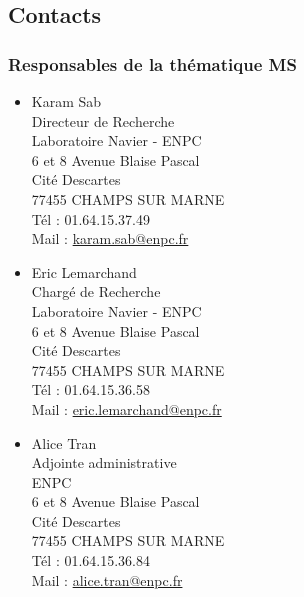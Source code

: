\documentclass[french,11pt]{article}
\begin{document}
\subsection{Contacts}

\subsubsection{Responsables de la thématique MS}
\begin{itemize}

\item Karam Sab\\
Directeur de Recherche\\
Laboratoire Navier - ENPC\\
6 et 8 Avenue Blaise Pascal\\
Cité Descartes\\
77455 CHAMPS SUR MARNE\\
Tél : 01.64.15.37.49\\
Mail : \href{mailto:karam.sab@enpc.fr}{karam.sab@enpc.fr}\\

\item Eric Lemarchand\\
Chargé de Recherche\\
Laboratoire Navier - ENPC\\
6 et 8 Avenue Blaise Pascal\\
Cité Descartes\\
77455 CHAMPS SUR MARNE\\
Tél : 01.64.15.36.58\\
Mail : \href{mailto:eric.lemarchand@enpc.fr}{eric.lemarchand@enpc.fr}\\


\item 
Alice Tran \\
Adjointe administrative \\
ENPC \\
6 et 8 Avenue Blaise Pascal \\
Cité Descartes\\
77455 CHAMPS SUR MARNE\\
Tél : 01.64.15.36.84 \\
Mail : \href{mailto:alice.tran@enpc.fr}{alice.tran@enpc.fr} \\
\end{itemize}


\newpage
\end{document}
